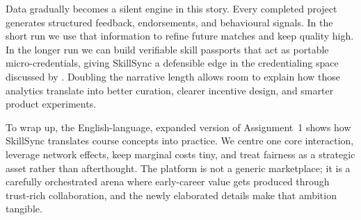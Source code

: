 Data gradually becomes a silent engine in this story. Every completed project generates structured feedback, endorsements, and behavioural signals. In the short run we use that information to refine future matches and keep quality high. In the longer run we can build verifiable skill passports that act as portable micro-credentials, giving SkillSync a defensible edge in the credentialing space discussed by \citet{Zuboff2019}. Doubling the narrative length allows room to explain how those analytics translate into better curation, clearer incentive design, and smarter product experiments.

To wrap up, the English-language, expanded version of Assignment~1 shows how SkillSync translates course concepts into practice. We centre one core interaction, leverage network effects, keep marginal costs tiny, and treat fairness as a strategic asset rather than afterthought. The platform is not a generic marketplace; it is a carefully orchestrated arena where early-career value gets produced through trust-rich collaboration, and the newly elaborated details make that ambition tangible.
